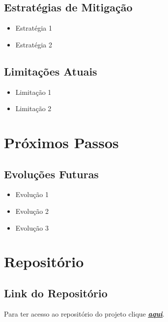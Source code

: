 \documentclass[12pt,a4paper]{article}
\begin{document}
\subsection{Estratégias de Mitigação}
\begin{itemize}
  \item Estratégia 1
  \item Estratégia 2
\end{itemize}

\subsection{Limitações Atuais}
\begin{itemize}
  \item Limitação 1
  \item Limitação 2
\end{itemize}

\section{Próximos Passos}

\subsection{Evoluções Futuras}
\begin{itemize}
  \item Evolução 1
  \item Evolução 2
  \item Evolução 3
\end{itemize}

\section{Repositório}

\subsection{Link do Repositório}
Para ter acesso ao repositório do projeto clique \href{https://github.com/007-Licensa-Para-Executar/challenge-2-base}{\textit{\textbf{\underline{aqui}}}}.
\end{document}
